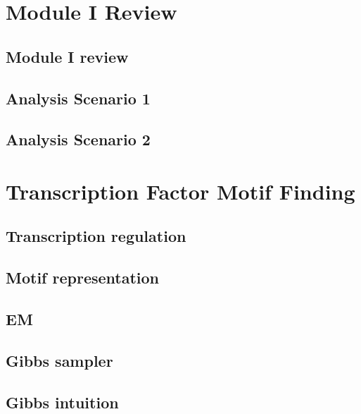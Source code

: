 \documentclass[
]{book}
\begin{document}
\hypertarget{m1re}{%
\chapter{Module I Review}\label{m1re}}

\hypertarget{module-i-review}{%
\section{Module I review}\label{module-i-review}}

\hypertarget{analysis-scenario-1}{%
\section{Analysis Scenario 1}\label{analysis-scenario-1}}

\hypertarget{analysis-scenario-2}{%
\section{Analysis Scenario 2}\label{analysis-scenario-2}}

\hypertarget{tfmf}{%
\chapter{Transcription Factor Motif Finding}\label{tfmf}}

\hypertarget{transcription-regulation}{%
\section{Transcription regulation}\label{transcription-regulation}}

\hypertarget{motif-representation}{%
\section{Motif representation}\label{motif-representation}}

\hypertarget{em}{%
\section{EM}\label{em}}

\hypertarget{gibbs-sampler}{%
\section{Gibbs sampler}\label{gibbs-sampler}}

\hypertarget{gibbs-intuition}{%
\section{Gibbs intuition}\label{gibbs-intuition}}
\end{document}

